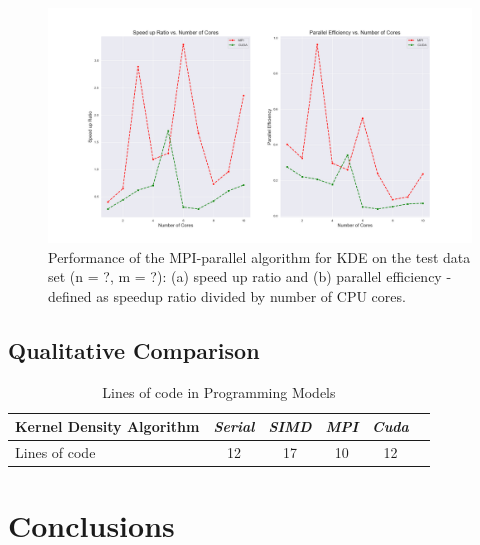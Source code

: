 \documentclass[review]{elsarticle}
\begin{document}
\begin{figure}
  \centering
  \includegraphics[scale=0.35]{figures/speedup_efficiency.png}
  \caption{Performance of the MPI-parallel algorithm for  KDE on the test data set (n = ?, m = ?): (a) speed up ratio and (b) parallel efficiency - defined as speedup ratio divided by number of CPU cores.}
  \label{fig:time_ncores}
\end{figure}


\subsection{Qualitative Comparison}

\begin{table}[h]
  \centering
\begin{tabular}{l *5c @{}}    \toprule
  Kernel Density Algorithm & \emph{Serial} & \emph{SIMD}  & \emph{MPI}  & \emph{Cuda}  \\\midrule
\rowcolor{blue!35} Lines of code & 12 & 17 & 10 & 12  \\ \bottomrule
 \hline
\end{tabular}
\caption{Lines of code in Programming Models}
\label{tab:sim_attr}
\end{table}


\section{Conclusions}


\nocite{*}

\end{document}
